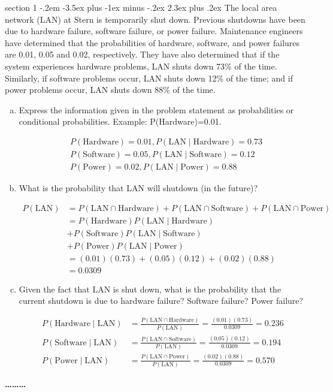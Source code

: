 \documentclass[answers,11pt]{exam}
\makeatletter
\newenvironment{problem}{\@startsection
       {section}
       {1}
       {-.2em}
       {-3.5ex plus -1ex minus -.2ex}
       {2.3ex plus .2ex}
       {\pagebreak[3]%
       \large\bf\noindent{Problem }
       }
       }
       {%
       \begin{center}\large\bf \ldots\ldots\ldots\end{center}}
\makeatother
\begin{document}
\begin{problem}{}
The local area network (LAN) at Stern is temporarily shut down. Previous shutdowns have been due to hardware failure, software failure, or power failure. 
Maintenance engineers have determined that the probabilities of hardware, software, and power failures are 0.01, 0.05 and 0.02, respectively.
They have also determined that if the system experiences hardware problems, LAN shuts down 73\% of the time. 
Similarly, if software problems occur, LAN shuts down 12\% of the time; and if power problems occur, LAN shuts down 88\% of the time.
\begin{enumerate}[(a)]
\item Express the information given in the problem statement as probabilities or conditional probabilities. Example: P(Hardware)=0.01.
\begin{solution}
\begin{align*}
&P(\text{Hardware})=0.01, P(\text{LAN}\mid \text{Hardware})=0.73\\
&P(\text{Software})=0.05, P(\text{LAN}\mid \text{Software})=0.12\\
&P(\text{Power})=0.02, P(\text{LAN}\mid \text{Power})=0.88
\end{align*}
\end{solution}
\item What is the probability that LAN will shutdown (in the future)?
\begin{solution}
\begin{align*}
P(\text{LAN}) &= P(\text{LAN}\cap \text{Hardware}) + P(\text{LAN}\cap \text{Software}) + P(\text{LAN}\cap \text{Power}) \\
        &= P(\text{Hardware}) P(\text{LAN} \mid \text{Hardware}) \\
        &+P(\text{Software}) P(\text{LAN} \mid \text{Software}) \\
        & +P(\text{Power}) P(\text{LAN} \mid \text{Power})  \\
            &= (0.01)(0.73) + (0.05)(0.12) + (0.02)(0.88) \\
            &= 0.0309
\end{align*}
\end{solution}
\item Given the fact that LAN is shut down, what is the probability that the current shutdown is due to hardware failure? Software failure? Power failure?
\begin{solution}
\begin{align*}
P(\text{Hardware}\mid \text{LAN}) &= \frac{P(\text{LAN}\cap \text{Hardware})}{P(\text{LAN})}=\frac{(0.01)(0.73)}{0.0309}=0.236\\
P(\text{Software}\mid \text{LAN}) &= \frac{P(\text{LAN}\cap \text{Software})}{P(\text{LAN})}=\frac{(0.05)(0.12)}{0.0309}=0.194\\
P(\text{Power}\mid \text{LAN}) &= \frac{P(\text{LAN}\cap \text{Power})}{P(\text{LAN})}=\frac{(0.02)(0.88)}{0.0309}=0.570
\end{align*}
\end{solution}
\end{enumerate}
\end{problem}
\end{document}

